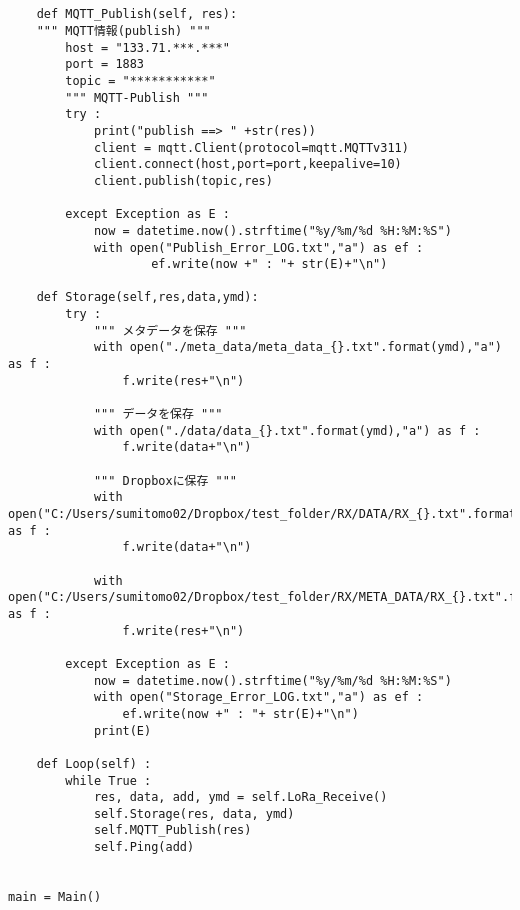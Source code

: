 \begin{lstlisting}[label=lorar,caption=LoRa\_obs\_raceive.py]
                        

    def MQTT_Publish(self, res):
    """ MQTT情報(publish) """
        host = "133.71.***.***"
        port = 1883
        topic = "***********"
        """ MQTT-Publish """
        try :   
            print("publish ==> " +str(res))
            client = mqtt.Client(protocol=mqtt.MQTTv311)
            client.connect(host,port=port,keepalive=10)
            client.publish(topic,res)
                        
        except Exception as E :
            now = datetime.now().strftime("%y/%m/%d %H:%M:%S")
            with open("Publish_Error_LOG.txt","a") as ef :
                    ef.write(now +" : "+ str(E)+"\n")
                
    def Storage(self,res,data,ymd):
        try :
            """ メタデータを保存 """
            with open("./meta_data/meta_data_{}.txt".format(ymd),"a") as f :
                f.write(res+"\n")

            """ データを保存 """
            with open("./data/data_{}.txt".format(ymd),"a") as f :
                f.write(data+"\n")

            """ Dropboxに保存 """
            with open("C:/Users/sumitomo02/Dropbox/test_folder/RX/DATA/RX_{}.txt".format(ymd),"a") as f :
                f.write(data+"\n")

            with open("C:/Users/sumitomo02/Dropbox/test_folder/RX/META_DATA/RX_{}.txt".format(ymd),"a") as f :
                f.write(res+"\n")
                
        except Exception as E :
            now = datetime.now().strftime("%y/%m/%d %H:%M:%S")
            with open("Storage_Error_LOG.txt","a") as ef :
                ef.write(now +" : "+ str(E)+"\n")
            print(E)
            
    def Loop(self) :
        while True :
            res, data, add, ymd = self.LoRa_Receive()
            self.Storage(res, data, ymd)
            self.MQTT_Publish(res)
            self.Ping(add)
            

main = Main()
\end{lstlisting}
